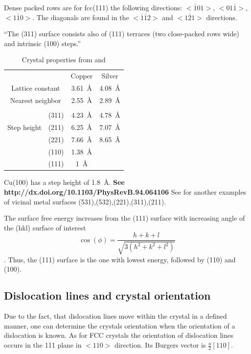 Dense packed rows are for fcc(111) the following directions: $<\bar 1 01>$, $<01\bar 1>$, $<1\bar 1 0>$. The diagonals are found in the $<\bar 1 \bar 1 2>$ and $<1\bar 2 1>$ directions.

``The (311) surface consists also of (111) terraces (two close-packed rows wide) and intrinsic (100) steps.''

\begin{table}\label{tab:crystal-prop}
\caption{Crystal properties from \cite[29ff]{riemann_ionic_2002} and \cite{liu_oxygen_2014}}
\centering
\begin{tabular}{cccc}
			&				& Copper 	 & Silver \\
\multicolumn{2}{c}{Lattice constant}			& \SI{3.61}{\angstrom} & \SI{4.08}{\angstrom} \\
\multicolumn{2}{c}{Nearest neighbor}			& \SI{2.55}{\angstrom} & \SI{2.89}{\angstrom} \\ \hline \\
\multirow{3}{*}{Step height}	& (311) & \SI{4.23}{\angstrom} & \SI{4.78}{\angstrom} \\
								& (211) & \SI{6.25}{\angstrom} & \SI{7.07}{\angstrom} \\
								& (221) & \SI{7.66}{\angstrom} & \SI{8.65}{\angstrom} \\
								& (110) & \SI{1.38}{\angstrom} & \\
								& (111) & \SI{1}{\angstrom} & \\
\end{tabular}
\end{table}
Cu(100) has a step height of \SI{1.8}{\angstrom}. \textbf{See http://dx.doi.org/10.1103/PhysRevB.94.064106}
See \cite{riemann_ionic_2002} for another examples of vicinal metal surfaces (531),(532),(221),(311),(211).

The surface free energy increases from the (111) surface with increasing angle of the (hkl) surface of interest $$\cos(\phi)=\frac{h+k+l}{\sqrt{3(h^2+k^2+l^2)}}$$ \cite{jian-min_calculation_2004}. Thus, the (111) surface is the one with lowest energy, followed by (110) and (100).

\subsection{Dislocation lines and crystal orientation}
Due to the fact, that dislocation lines move within the crystal in a defined manner, one can determine the crystals orientation when the orientation of a dislocation is known.
As for FCC crystals the orientation of dislocation lines occurs in the {111} plane in $<110>$ direction. Its Burgers vector is $\frac{a}{2}[110]$\cite{_dislocation-theory}.
